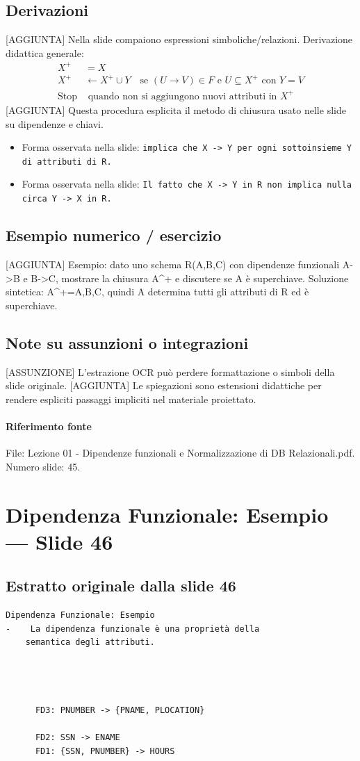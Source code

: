 \documentclass[11pt]{article}
\begin{document}
\subsection*{Derivazioni}
[AGGIUNTA] Nella slide compaiono espressioni simboliche/relazioni. Derivazione didattica generale:
\begin{align*}
X^+ &= X \\
X^+ &\leftarrow X^+ \cup Y \quad \text{se } (U \to V) \in F \text{ e } U \subseteq X^+ \text{ con } Y=V \\
\text{Stop} &\text{ quando non si aggiungono nuovi attributi in } X^+
\end{align*}
[AGGIUNTA] Questa procedura esplicita il metodo di chiusura usato nelle slide su dipendenze e chiavi.
\begin{itemize}[leftmargin=*]
\item Forma osservata nella slide: \texttt{implica che X -> Y per ogni sottoinsieme Y di attributi di R.}
\item Forma osservata nella slide: \texttt{Il fatto che X -> Y in R non implica nulla circa Y -> X in R.}
\end{itemize}
\subsection*{Esempio numerico / esercizio}
[AGGIUNTA] Esempio: dato uno schema R(A,B,C) con dipendenze funzionali A->B e B->C, mostrare la chiusura A^+ e discutere se A è superchiave. Soluzione sintetica: A^+={A,B,C}, quindi A determina tutti gli attributi di R ed è superchiave.
\subsection*{Note su assunzioni o integrazioni}
[ASSUNZIONE] L'estrazione OCR può perdere formattazione o simboli della slide originale.
[AGGIUNTA] Le spiegazioni sono estensioni didattiche per rendere espliciti passaggi impliciti nel materiale proiettato.
\paragraph{Riferimento fonte} File: Lezione 01 - Dipendenze funzionali e Normalizzazione di DB Relazionali.pdf. Numero slide: 45.
\section{Dipendenza Funzionale: Esempio --- Slide 46}
\subsection*{Estratto originale dalla slide 46}
\begin{lstlisting}
Dipendenza Funzionale: Esempio
-    La dipendenza funzionale è una proprietà della
    semantica degli attributi.




      FD3: PNUMBER -> {PNAME, PLOCATION}

      FD2: SSN -> ENAME
      FD1: {SSN, PNUMBER} -> HOURS
\end{lstlisting}
\end{document}
